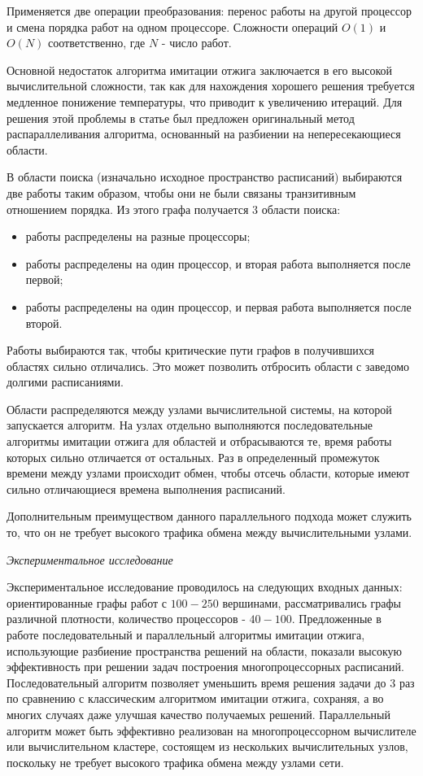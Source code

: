 \documentclass{article}
\begin{document}
Применяется две операции преобразования: перенос работы на другой процессор и смена порядка работ на одном процессоре. Сложности операций $O(1)$ и $O(N)$ соответственно, где $N$ - число работ. \par
Основной недостаток алгоритма имитации отжига заключается в его высокой вычислительной сложности, так как для нахождения хорошего решения требуется медленное понижение температуры, что приводит к увеличению итераций. Для решения этой проблемы в статье был предложен оригинальный метод распараллеливания алгоритма, основанный на разбиении на непересекающиеся области. \par
В области поиска (изначально исходное пространство расписаний) выбираются две работы таким образом, чтобы они не были связаны транзитивным отношением порядка. Из этого графа получается 3 области поиска:
\begin{itemize}
  \item работы распределены на разные процессоры;
  \item работы распределены на один процессор, и вторая работа выполняется после первой;
  \item работы распределены на один процессор, и первая работа выполняется после второй.
\end{itemize}
Работы выбираются так, чтобы критические пути графов в получившихся областях сильно отличались. Это может позволить отбросить области с заведомо долгими расписаниями. \par
Области распределяются между узлами вычислительной системы, на которой запускается алгоритм. На узлах отдельно выполняются последовательные алгоритмы имитации отжига для областей и отбрасываются те, время работы которых сильно отличается от остальных. Раз в определенный промежуток времени между узлами происходит обмен, чтобы отсечь области, которые имеют сильно отличающиеся времена выполнения расписаний. \par
Дополнительным преимуществом данного параллельного подхода может служить то, что он не требует высокого трафика обмена между вычислительными узлами. \par
\textit{Экспериментальное исследование}\par
Экспериментальное исследование проводилось на следующих входных данных: ориентированные графы работ с $100-250$ вершинами, рассматривались графы различной плотности, количество процессоров - $40-100$. Предложенные в работе \cite{Kalashnikov_2008} последовательный и параллельный алгоритмы имитации отжига, использующие разбиение пространства решений на области, показали высокую эффективность при решении задач построения многопроцессорных расписаний. Последовательный алгоритм позволяет уменьшить время решения задачи до 3 раз по сравнению с классическим алгоритмом имитации отжига, сохраняя, а во многих случаях даже улучшая качество получаемых решений. Параллельный алгоритм может быть эффективно реализован на многопроцессорном вычислителе или вычислительном кластере, состоящем из нескольких вычислительных узлов, поскольку не требует высокого трафика обмена между узлами сети. \par
\end{document}
